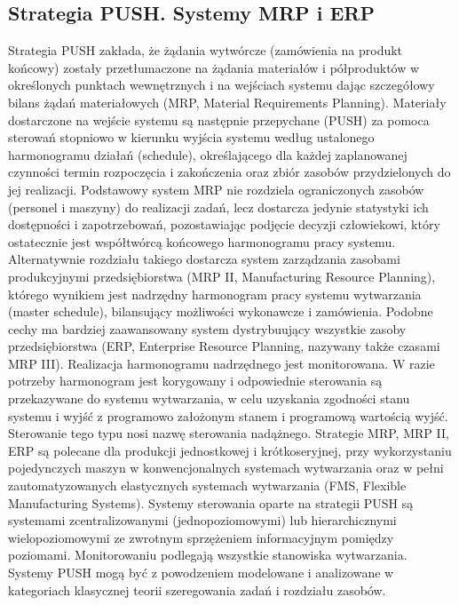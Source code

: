 \documentclass[10pt, a
4paper]{article}
\begin{document}
\subsection{Strategia PUSH. Systemy MRP i ERP}
Strategia PUSH zakłada, że żądania wytwórcze (zamówienia na produkt końcowy) zostały przetłumaczone na żądania materiałów i półproduktów w określonych punktach wewnętrznych i na wejściach systemu dając szczegółowy bilans żądań materiałowych (MRP, Material Requirements Planning). Materiały dostarczone na wejście systemu są następnie przepychane (PUSH) za pomoca sterowań stopniowo w kierunku wyjścia systemu według ustalonego harmonogramu działań (schedule), określającego dla każdej zaplanowanej czynności termin rozpoczęcia i zakończenia oraz zbiór zasobów przydzielonych do jej realizacji. Podstawowy system MRP nie rozdziela ograniczonych zasobów (personel i maszyny) do realizacji zadań, lecz dostarcza jedynie statystyki ich dostępności i zapotrzebowań, pozostawiając podjęcie decyzji człowiekowi, który ostatecznie jest współtwórcą końcowego harmonogramu pracy systemu. Alternatywnie rozdziału takiego dostarcza system zarządzania zasobami produkcyjnymi przedsiębiorstwa (MRP II, Manufacturing Resource Planning), którego wynikiem jest nadrzędny harmonogram pracy systemu wytwarzania (master schedule), bilansujący możliwości wykonawcze i zamówienia. Podobne cechy ma bardziej zaawansowany system dystrybuujący wszystkie zasoby przedsiębiorstwa (ERP, Enterprise Resource Planning, nazywany także czasami MRP III). Realizacja harmonogramu nadrzędnego jest monitorowana. W razie potrzeby harmonogram jest korygowany i odpowiednie sterowania są przekazywane do systemu wytwarzania, w celu uzyskania zgodności stanu systemu i wyjść z programowo założonym stanem i programową wartością wyjść. Sterowanie tego typu nosi nazwę sterowania nadążnego. Strategie MRP, MRP II, ERP są polecane dla produkcji jednostkowej i krótkoseryjnej, przy wykorzystaniu pojedynczych maszyn w konwencjonalnych systemach wytwarzania oraz w pełni zautomatyzowanych elastycznych systemach wytwarzania (FMS, Flexible Manufacturing Systems). Systemy sterowania oparte na strategii PUSH są systemami zcentralizowanymi (jednopoziomowymi) lub hierarchicznymi wielopoziomowymi ze zwrotnym sprzężeniem informacyjnym pomiędzy poziomami. Monitorowaniu podlegają wszystkie stanowiska wytwarzania. Systemy PUSH mogą być z powodzeniem modelowane i analizowane w kategoriach klasycznej teorii szeregowania zadań i rozdziału zasobów.
\end{document}
